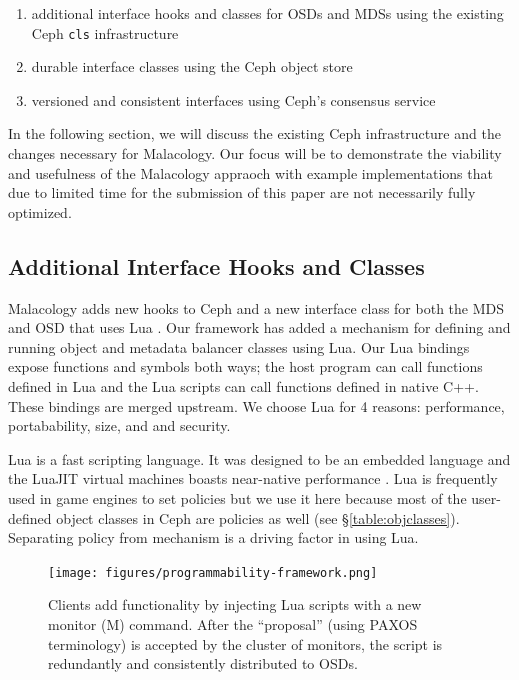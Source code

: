 \documentclass[10pt,twocolumn]{article}
\begin{document}
\begin{enumerate}
\def\labelenumi{\arabic{enumi}.}
\item
  additional interface hooks and classes for OSDs and MDSs using the
  existing Ceph \texttt{cls} infrastructure
\item
  durable interface classes using the Ceph object store
\item
  versioned and consistent interfaces using Ceph's consensus service
\end{enumerate}

In the following section, we will discuss the existing Ceph
infrastructure and the changes necessary for Malacology. Our focus will
be to demonstrate the viability and usefulness of the Malacology
appraoch with example implementations that due to limited time for the
submission of this paper are not necessarily fully optimized.

\subsection{Additional Interface Hooks and
Classes}\label{additional-interface-hooks-and-classes}

Malacology adds new hooks to Ceph and a new interface class for both the
MDS and OSD that uses Lua
\autocite{ierusalimschy:lua15}\autocite{ierusalimschy:spe96}. Our
framework has added a mechanism for defining and running object and
metadata balancer classes using Lua. Our Lua bindings expose functions
and symbols both ways; the host program can call functions defined in
Lua and the Lua scripts can call functions defined in native C++. These
bindings are merged upstream. We choose Lua for 4 reasons: performance,
portabability, size, and and security.

Lua is a fast scripting language. It was designed to be an embedded
language and the LuaJIT virtual machines boasts near-native performance
\autocite{pall:luajit15}\autocite{grawinkel_pdsw12}. Lua is frequently
used in game engines to set policies but we use it here because most of
the user-defined object classes in Ceph are policies as well (see
\S\ref{table:objclasses}). Separating policy from mechanism is a driving
factor in using Lua.

\begin{figure}[htbp]
\centering
\texttt{[image: figures/programmability-framework.png]}
\caption{Clients add functionality by injecting Lua scripts with a new
monitor (M) command. After the ``proposal'' (using PAXOS terminology) is
accepted by the cluster of monitors, the script is redundantly and
consistently distributed to OSDs. \label{fig:programmability-framework}}
\end{figure}
\end{document}

